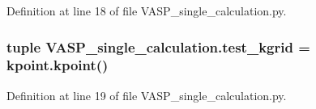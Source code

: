 Definition at line 18 of file V\+A\+S\+P\+\_\+single\+\_\+calculation.\+py.

\hypertarget{namespace_v_a_s_p__single__calculation_aa433214ab7a7849ed7a12c9a6c93673d}{
\subsubsection[{test\+\_\+kgrid}]{\setlength{\rightskip}{0pt plus 5cm}tuple V\+A\+S\+P\+\_\+single\+\_\+calculation.\+test\+\_\+kgrid = kpoint.\+kpoint()}}\label{namespace_v_a_s_p__single__calculation_aa433214ab7a7849ed7a12c9a6c93673d}


Definition at line 19 of file V\+A\+S\+P\+\_\+single\+\_\+calculation.\+py.

